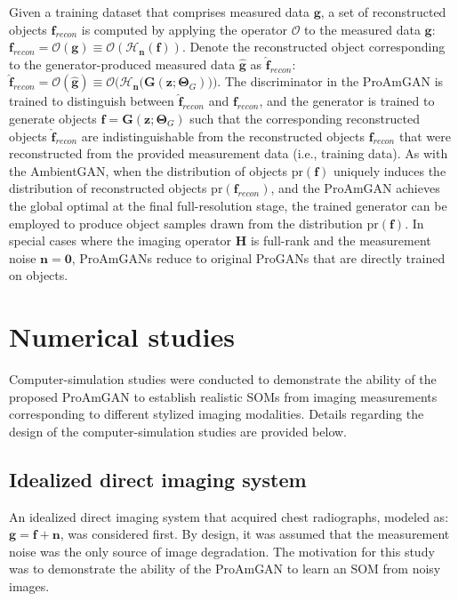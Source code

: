 \documentclass[journal]{IEEEtran}
\renewcommand{\vec}[1]{\mathbf{#1}}
\begin{document}
Given a training dataset that comprises measured data $\vec{g}$,
 a set of reconstructed objects $\vec{f}_{recon}$
 is computed by applying
 the operator $\mathcal{O}$ to the measured data $\vec{g}$:  $\vec{f}_{recon} = \mathcal{O}(\vec{g}) \equiv \mathcal{O}(\mathcal{H}_\vec{n}(\vec{f}))$.
 Denote the reconstructed object corresponding to the generator-produced measured data $\hat{\vec{g}}$  as $\hat{\vec{f}}_{recon}$: $\hat{\vec{f}}_{recon} = \mathcal{O}(\hat{\vec{g}}) \equiv \mathcal{O}\Big(\mathcal{H}_\vec{n}\big(\mathbf{G}(\mathbf{z}; \mathbf{\Theta}_{G}) \big) \Big)$. %
The discriminator in the ProAmGAN is trained to distinguish between $\hat{\vec{f}}_{recon}$ and $\vec{f}_{recon}$,
and the generator is trained to generate objects $\hat{\vec{f}} = \mathbf{G}(\mathbf{z}; \mathbf{\Theta}_{G})$ such that the corresponding reconstructed objects $\hat{\vec{f}}_{recon}$ are
indistinguishable from the reconstructed objects ${\vec{f}}_{recon}$ that were reconstructed from the provided measurement data (i.e., training data).
As with the AmbientGAN, when the distribution of objects $\mathrm{pr}(\vec{f})$ uniquely induces the distribution of reconstructed objects $\mathrm{pr}(\vec{f}_{recon})$, and the ProAmGAN achieves the global optimal at the final full-resolution stage, 
the trained generator can be employed to produce object samples drawn from the distribution $\mathrm{pr}(\vec{f})$.
In special cases where the imaging operator $\mathbf{H}$ is full-rank and the measurement noise $\vec{n} = \vec{0}$,
 ProAmGANs reduce to original ProGANs that are directly trained on objects.

\section{Numerical studies}
\label{sec:num}

Computer-simulation studies were conducted to demonstrate the ability of the proposed ProAmGAN to establish realistic SOMs from imaging measurements corresponding to different
 stylized imaging modalities.
Details regarding the design of the computer-simulation studies are provided below.

\subsection{Idealized direct imaging system}
\label{subsec:num_X}

An idealized direct imaging system that acquired chest radiographs, modeled as: $\vec{g} = \vec{f} + \vec{n}$, was considered first.
By design, it was assumed that the measurement noise was the only source
of image degradation. 
The motivation for this study was to demonstrate the ability of the ProAmGAN to learn an SOM from noisy images.
\end{document}
